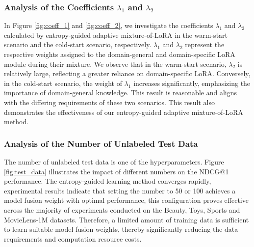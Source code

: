 \subsubsection{\textbf{Analysis of the Coefficients $\lambda_1$ and $\lambda_2$}}
In Figure \ref{fig:coeff_1} and \ref{fig:coeff_2}, we investigate the coefficients $\lambda_1$ and $\lambda_2$ calculated by entropy-guided adaptive mixture-of-LoRA in the warm-start scenario and the cold-start scenario, respectively. $\lambda_1$ and $\lambda_2$ represent the respective weights assigned to the domain-general and domain-specific LoRA module during their mixture. We observe that in the warm-start scenario, $\lambda_2$ is relatively large, reflecting a greater reliance on domain-specific LoRA. Conversely, in the cold-start scenario, the weight of $\lambda_1$ increases significantly, emphasizing the importance of domain-general knowledge. This result is reasonable and aligns with the differing requirements of these two scenarios. 
This result also demonstrates the effectiveness of our entropy-guided adaptive mixture-of-LoRA method.

\subsubsection{\textbf{Analysis of the Number of Unlabeled Test Data}}
The number of unlabeled test data is one of the hyperparameters. Figure \ref{fig:test_data} illustrates the impact of different numbers on the NDCG@1 performance. The entropy-guided learning method converges rapidly, experimental results indicate that setting the number to 50 or 100 achieves a model fusion weight with optimal performance, this configuration proves effective across the majority of experiments conducted on the Beauty, Toys, Sports and MovieLens-1M datasets.
Therefore, a limited amount of training data is sufficient to learn suitable model fusion weights, thereby significantly reducing the data requirements and computation resource costs.

\iffalse
\subsubsection{\textbf{The Impact of Language Model Size.}}
\fi
